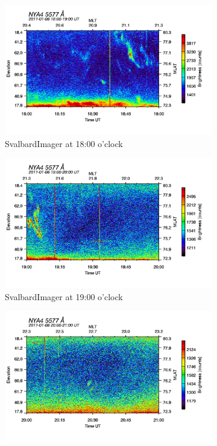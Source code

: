 \documentclass[10pt,a4paper]{article}
\begin{document}
\begin{figure}[h]
\centering
\begin{subfigure}{0.3\textwidth}
\centering
	\includegraphics[width=\textwidth]{SvalbardImager5577A18.png}
	\caption{ SvalbardImager at 18:00 o'clock \label{SBI_5_18}}
\end{subfigure}
\begin{subfigure}{0.3\textwidth}
\centering
	\includegraphics[width=\textwidth]{SvalbardImager5577A19.png}
	\caption{ SvalbardImager at 19:00 o'clock \label{SBI_5_19}}
\end{subfigure}
\begin{subfigure}{0.3\textwidth}
\centering
	\includegraphics[width=\textwidth]{SvalbardImager5577A20.png}

\end{subfigure}
\end{figure}
\end{document}
